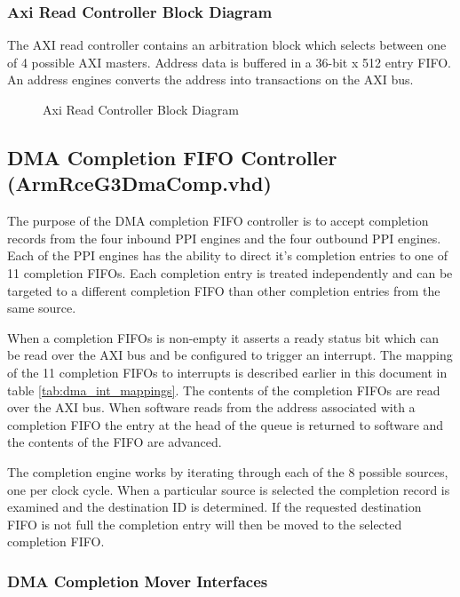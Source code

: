 \documentclass[11pt]{article}
\begin{document}
\subsubsection{Axi Read Controller Block Diagram}

The AXI read controller contains an arbitration block which selects between one of 4 possible AXI masters. Address data is 
buffered in a 36-bit x 512 entry FIFO. An address engines converts the address into transactions on the AXI bus. 

\begin{figure}[H]
   \centering
   \caption{Axi Read Controller Block Diagram}
   \label{fig:axi_read_block}
\end{figure}

\subsection{DMA Completion FIFO Controller (ArmRceG3DmaComp.vhd)}
\label{subsec:ArmRceG3DmaComp}

The purpose of the DMA completion FIFO controller is to accept completion records from the four inbound PPI engines and the four outbound PPI engines. 
Each of the PPI engines has the ability to direct it's completion entries to one of 11 completion FIFOs. Each completion entry is treated independently 
and can be targeted to a different completion FIFO than other completion entries from the same source. 

When a completion FIFOs is non-empty it asserts a ready status bit which can be read over the AXI bus and be configured to trigger an interrupt. 
The mapping of the 11 completion FIFOs to interrupts is described earlier in this document in table \ref{tab:dma_int_mappings}. The contents of
the completion FIFOs are read over the AXI bus. When software reads from the address associated with a completion FIFO the entry at the head of
the queue is returned to software and the contents of the FIFO are advanced. 

The completion engine works by iterating through each of the 8 possible sources, one per clock cycle. When a particular source is selected the
completion record is examined and the destination ID is determined. If the requested destination FIFO is not full the completion entry will 
then be moved to the selected completion FIFO. 

\subsubsection{DMA Completion Mover Interfaces}
\end{document}
